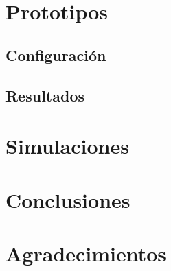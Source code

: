 \documentclass[11pt,a4paper]{article}
\begin{document}
\section{Prototipos} \label{sec:ch04}

	\subsection{Configuración}
	
	
	\subsection{Resultados}
	

\section{Simulaciones} \label{sec:ch04}


\section{Conclusiones} \label{sec:conclusions}


\section{Agradecimientos} \label{sec:conclusions}

\end{document}
